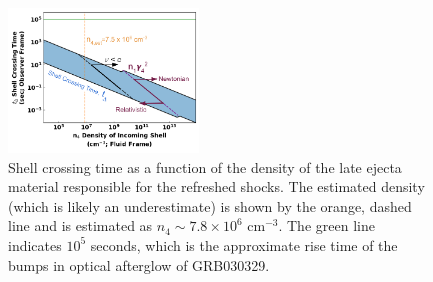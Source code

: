 \documentclass[linenumbers,twocolumn]{aastex631}
\begin{document}
{    \begin{figure}[t!]
        \centering
        \includegraphics[width=0.45\textwidth]{shell-cross-time.png}
        \caption{Shell crossing time as a function of the density of the late ejecta material responsible for the refreshed shocks. The estimated density (which is likely an underestimate) is shown by the orange, dashed line and is estimated as $n_4 \sim 7.8 \times 10^{6}$ cm$^{-3}$. The green line indicates $10^{5}$ seconds, which is the approximate rise time of the bumps in optical afterglow of GRB030329.}
        \label{fig: shell cross time}
    \end{figure}
}
\end{document}

